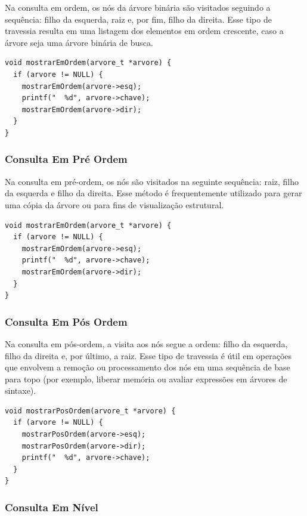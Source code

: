 Na consulta em ordem, os nós da árvore binária são visitados seguindo a sequência: filho da esquerda, raiz e, por fim, filho da direita. Esse tipo de travessia resulta em uma listagem dos elementos em ordem crescente, caso a árvore seja uma árvore binária de busca.

\begin{lstlisting}
void mostrarEmOrdem(arvore_t *arvore) {
  if (arvore != NULL) {
    mostrarEmOrdem(arvore->esq);
    printf("  %d", arvore->chave);
    mostrarEmOrdem(arvore->dir);
  }
}
\end{lstlisting}

\subsubsection{Consulta Em Pré Ordem}

Na consulta em pré-ordem, os nós são visitados na seguinte sequência: raiz, filho da esquerda e filho da direita. Esse método é frequentemente utilizado para gerar uma cópia da árvore ou para fins de visualização estrutural.

\begin{lstlisting}
void mostrarEmOrdem(arvore_t *arvore) {
  if (arvore != NULL) {
    mostrarEmOrdem(arvore->esq);
    printf("  %d", arvore->chave);
    mostrarEmOrdem(arvore->dir);
  }
}
\end{lstlisting}

\subsubsection{Consulta Em Pós Ordem}

Na consulta em pós-ordem, a visita aos nós segue a ordem: filho da esquerda, filho da direita e, por último, a raiz. Esse tipo de travessia é útil em operações que envolvem a remoção ou processamento dos nós em uma sequência de base para topo (por exemplo, liberar memória ou avaliar expressões em árvores de sintaxe).

\begin{lstlisting}
void mostrarPosOrdem(arvore_t *arvore) {
  if (arvore != NULL) {
    mostrarPosOrdem(arvore->esq);
    mostrarPosOrdem(arvore->dir);
    printf("  %d", arvore->chave);
  }
}
\end{lstlisting}

\subsubsection{Consulta Em Nível}


